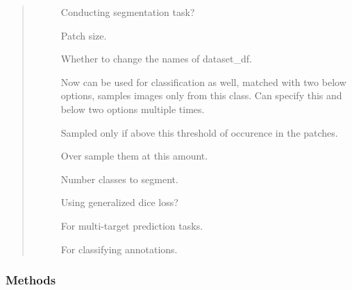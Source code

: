 \documentclass[letterpaper,10pt,english]{sphinxmanual}
\begin{document}
\begin{fulllineitems}
\begin{quote}
\begin{description}
\begin{description}
\item[{}] \leavevmode
Conducting segmentation task?

\item[{}] \leavevmode
Patch size.

\item[{}] \leavevmode
Whether to change the names of dataset\_df.

\item[{}] \leavevmode
Now can be used for classification as well, matched with two below options, samples images only from this class. Can specify this and below two options multiple times.

\item[{}] \leavevmode
Sampled only if above this threshold of occurence in the patches.

\item[{}] \leavevmode
Over sample them at this amount.

\item[{}] \leavevmode
Number classes to segment.

\item[{}] \leavevmode
Using generalized dice loss?

\item[{}] \leavevmode
For multi-target prediction tasks.

\item[{}] \leavevmode
For classifying annotations.

\end{description}

\end{description}\end{quote}
\subsubsection*{Methods}


\begin{savenotes}\sphinxatlongtablestart\begin{longtable}[c]{}
\hline

\endfirsthead


\end{longtable}
\end{savenotes}
\end{fulllineitems}
\end{document}

